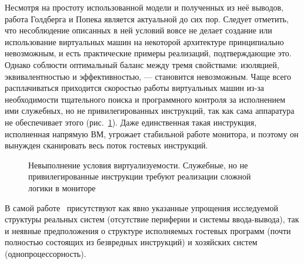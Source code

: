 Несмотря на простоту использованной модели и полученных из неё выводов, работа Голдберга и Попека является актуальной до сих пор. Следует отметить, что несоблюдение описанных в ней условий вовсе не делает создание или использование виртуальных машин на некоторой архитектуре принципиально невозможным, и есть практические примеры реализаций, подтверждающие это. Однако соблюсти оптимальный баланс между тремя свойствами: изоляцией, эквивалентностью и эффективностью, --- становится невозможным. Чаще всего расплачиваться приходится скоростью работы виртуальных машин из-за необходимости тщательного поиска и программного контроля за исполнением ими служебных, но не привилегированных инструкций, так как сама аппаратура не обеспечивает этого (рис.~\ref{fig:vm-bad-condition}). Даже единственная такая инструкция, исполненная напрямую ВМ, угрожает стабильной работе монитора, и поэтому он вынужден сканировать весь поток гостевых инструкций.

\begin{figure}[htb]
    \centering
    \caption[Невыполнение условия виртуализуемости]{Невыполнение условия виртуализуемости. Служебные, но не привилегированные инструкции требуют реализации сложной логики в мониторе}
    \label{fig:vm-bad-condition}
\end{figure}

В самой работе~\cite{popek} присутствуют как явно указанные упрощения исследуемой структуры реальных систем (отсутствие периферии и системы ввода-вывода), так и неявные предположения о структуре исполняемых гостевых программ (почти полностью состоящих из безвредных инструкций) и хозяйских систем (однопроцессорность).

